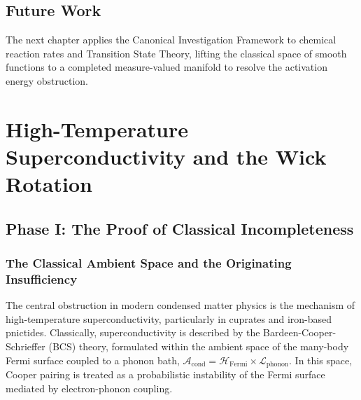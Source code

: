 \documentclass[11pt,openany]{extbook}
\newenvironment{futurework}{\section*{Future Work}}{}
\theoremstyle{plain}
\theoremstyle{definition}
\begin{document}
\begin{futurework}
\noindent The next chapter applies the Canonical Investigation Framework to chemical reaction rates and Transition State Theory, lifting the classical space of smooth functions to a completed measure-valued manifold to resolve the activation energy obstruction.
\end{futurework}

\chapter{High-Temperature Superconductivity and the Wick Rotation}

\section{Phase I: The Proof of Classical Incompleteness}

\subsection{The Classical Ambient Space and the Originating Insufficiency}
The central obstruction in modern condensed matter physics is the mechanism of high-temperature superconductivity, particularly in cuprates and iron-based pnictides. Classically, superconductivity is described by the Bardeen-Cooper-Schrieffer (BCS) theory, formulated within the ambient space of the many-body Fermi surface coupled to a phonon bath, $\mathcal{A}_{\text{cond}} = \mathcal{H}_{\text{Fermi}} \times \mathcal{L}_{\text{phonon}}$. In this space, Cooper pairing is treated as a probabilistic instability of the Fermi surface mediated by electron-phonon coupling.
\end{document}
